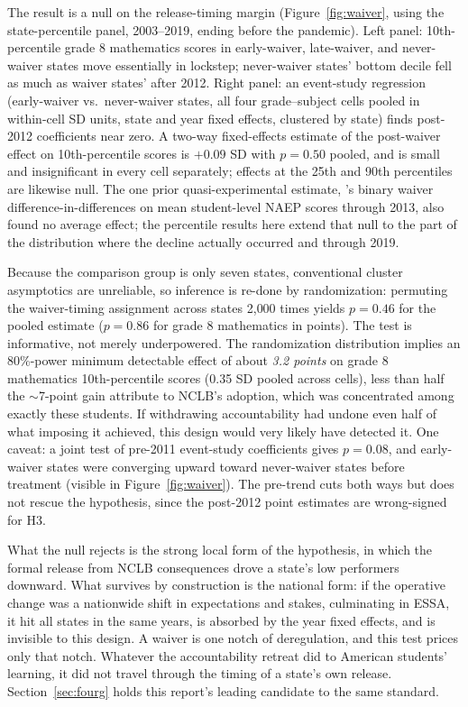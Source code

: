 \documentclass[11pt]{article}
\begin{document}
The result is a null on the release-timing margin (Figure~\ref{fig:waiver}, using the state-percentile panel, 2003--2019, ending before the pandemic). Left panel: 10th-percentile grade 8 mathematics scores in early-waiver, late-waiver, and never-waiver states move essentially in lockstep; never-waiver states' bottom decile fell as much as waiver states' after 2012. Right panel: an event-study regression (early-waiver vs.\ never-waiver states, all four grade--subject cells pooled in within-cell SD units, state and year fixed effects, clustered by state) finds post-2012 coefficients near zero. A two-way fixed-effects estimate of the post-waiver effect on 10th-percentile scores is $+0.09$ SD with $p=0.50$ pooled, and is small and insignificant in every cell separately; effects at the 25th and 90th percentiles are likewise null. The one prior quasi-experimental estimate, \citet{bleiberg2020}'s binary waiver difference-in-differences on mean student-level NAEP scores through 2013, also found no average effect; the percentile results here extend that null to the part of the distribution where the decline actually occurred and through 2019.

Because the comparison group is only seven states, conventional cluster asymptotics are unreliable, so inference is re-done by randomization: permuting the waiver-timing assignment across states 2{,}000 times yields $p=0.46$ for the pooled estimate ($p=0.86$ for grade 8 mathematics in points). The test is informative, not merely underpowered. The randomization distribution implies an 80\%-power minimum detectable effect of about \emph{3.2 points} on grade 8 mathematics 10th-percentile scores (0.35 SD pooled across cells), less than half the $\sim$7-point gain \citet{deejacob2011} attribute to NCLB's adoption, which was concentrated among exactly these students. If withdrawing accountability had undone even half of what imposing it achieved, this design would very likely have detected it. One caveat: a joint test of pre-2011 event-study coefficients gives $p=0.08$, and early-waiver states were converging upward toward never-waiver states before treatment (visible in Figure~\ref{fig:waiver}). The pre-trend cuts both ways but does not rescue the hypothesis, since the post-2012 point estimates are wrong-signed for H3.

What the null rejects is the strong local form of the hypothesis, in which the formal release from NCLB consequences drove a state's low performers downward. What survives by construction is the national form: if the operative change was a nationwide shift in expectations and stakes, culminating in ESSA, it hit all states in the same years, is absorbed by the year fixed effects, and is invisible to this design. A waiver is one notch of deregulation, and this test prices only that notch. Whatever the accountability retreat did to American students' learning, it did not travel through the timing of a state's own release. Section~\ref{sec:fourg} holds this report's leading candidate to the same standard.
\end{document}
